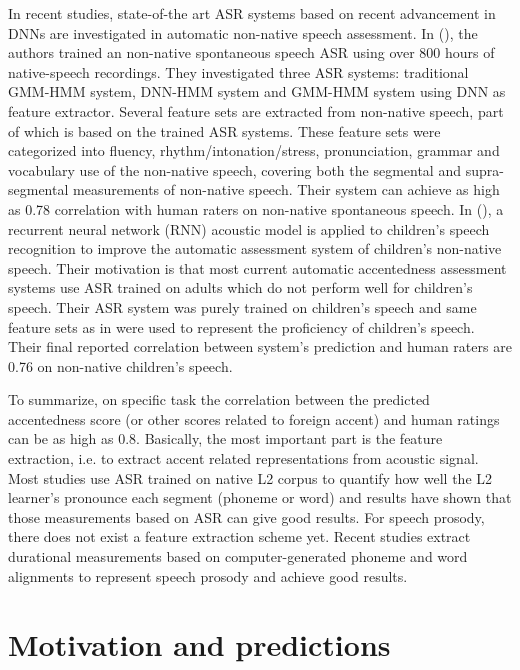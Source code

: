 In recent studies, state-of-the art ASR systems based on recent advancement in DNNs are investigated in automatic non-native speech assessment. In (\cite{tao2016exploring}), the authors trained an non-native spontaneous speech ASR using over 800 hours of native-speech recordings. They investigated three ASR systems: traditional GMM-HMM system, DNN-HMM system and GMM-HMM system using DNN as feature extractor. Several feature sets are extracted from non-native speech, part of which is based on the trained ASR systems. These feature sets were categorized into fluency, rhythm/intonation/stress, pronunciation, grammar and vocabulary use of the non-native speech, covering both the segmental and supra-segmental measurements of non-native speech. Their system can achieve as high as 0.78 correlation with human raters on non-native spontaneous speech. In (\cite{qian2017bidirectional}), a recurrent neural network (RNN) acoustic model is applied to children's speech recognition to improve the automatic assessment system of children's non-native speech. Their motivation is that most current automatic accentedness assessment systems use ASR trained on adults which do not perform well for children's speech. Their ASR system was purely trained on children's speech and same feature sets as in \cite{tao2016exploring} were used to represent the proficiency of children's speech. Their final reported correlation between system's prediction and human raters are 0.76 on non-native children's speech.

To summarize, on specific task the correlation between the predicted accentedness score (or other scores related to foreign accent) and human ratings can be as high as 0.8. Basically, the most important part is the feature extraction, i.e. to extract accent related representations from acoustic signal. Most studies use ASR trained on native L2 corpus to quantify how well the L2 learner's pronounce each segment (phoneme or word) and results have shown that those measurements based on ASR can give good results. For speech prosody, there does not exist a feature extraction scheme yet. Recent studies extract durational measurements based on computer-generated phoneme and word alignments to represent speech prosody and achieve good results.

\section{Motivation and predictions}

